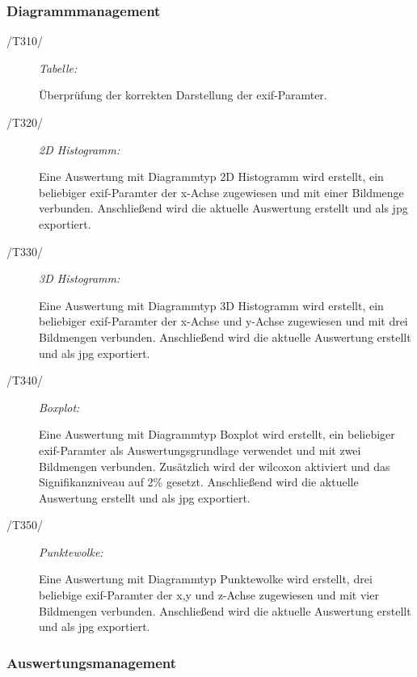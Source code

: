 	\subsubsection{Diagrammmanagement}
	
		\begin{description}
			
			\item[/T310/] \textit{Tabelle:}\par
			
			Überprüfung der korrekten Darstellung der \gls{exif}-Paramter. 

			\item[/T320/] \textit{2D Histogramm:}\par
			
			Eine Auswertung mit Diagrammtyp 2D Histogramm wird erstellt, ein beliebiger \gls{exif}-Paramter der x-Achse zugewiesen und mit einer Bildmenge verbunden. Anschließend wird die aktuelle Auswertung erstellt und als \gls{jpg} exportiert.
		
			\item[/T330/] \textit{3D Histogramm:}\par
			
			Eine Auswertung mit Diagrammtyp 3D Histogramm wird erstellt, ein beliebiger \gls{exif}-Paramter der x-Achse und y-Achse zugewiesen und mit drei Bildmengen verbunden. Anschließend wird die aktuelle Auswertung erstellt und als \gls{jpg} exportiert.

			\item[/T340/] \textit{Boxplot:}\par
			Eine Auswertung mit Diagrammtyp Boxplot wird erstellt, ein beliebiger \gls{exif}-Paramter als Auswertungsgrundlage verwendet und mit zwei Bildmengen verbunden. Zusätzlich wird der \gls{wilcoxon} aktiviert und das Signifikanzniveau auf 2\% gesetzt. Anschließend wird die aktuelle Auswertung erstellt und als \gls{jpg} exportiert.

			\item[/T350/] \textit{Punktewolke:}\par
			Eine Auswertung mit Diagrammtyp Punktewolke wird erstellt, drei beliebige \gls{exif}-Paramter der x,y und z-Achse zugewiesen und mit vier Bildmengen verbunden. Anschließend wird die aktuelle Auswertung erstellt und als \gls{jpg} exportiert.

		\end{description}
	
	\subsubsection{Auswertungsmanagement}

